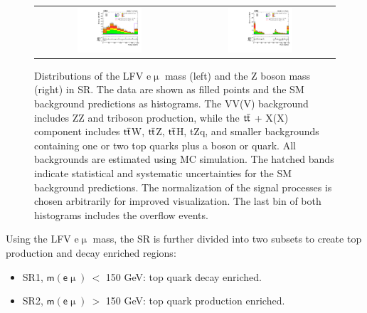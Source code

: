 \begin{figure}[tbh!]
 \begin{center}
 \begin{tabular}{cc}
 \includegraphics[width=0.45\textwidth]{figures/Part3/Selection/Memu}&
 \includegraphics[width=0.45\textwidth]{figures/Part3/Selection/Zmass} \\
 \end{tabular}
 \caption{Distributions of the LFV e$\upmu$ mass (left) and the Z boson mass (right) in \ac{SR}. The data are shown as filled points and the \ac{SM} background predictions as histograms. The VV(V) background includes ZZ and triboson production, while the $\ttbar$ + X(X) component includes $\ttbar$W, $\ttbar$Z, $\ttbar$H, tZq, and smaller backgrounds containing one or two top quarks plus a boson or quark. All backgrounds are estimated using \ac{MC} simulation. The hatched bands indicate statistical and systematic uncertainties for the \ac{SM} background predictions. The normalization of the signal processes is chosen arbitrarily for improved visualization. The last bin of both histograms includes the overflow events.}
 \label{fig:SR}
 \end{center}
\end{figure}

Using the LFV e$\upmu$ mass, the \ac{SR} is further divided into two subsets to create top production and decay enriched regions:

\begin{itemize}
\item SR1, $\textsf{m}(\textsf{e}\upmu)~<$ 150 GeV: top quark decay enriched.
\item SR2, $\textsf{m}(\textsf{e}\upmu)~>$ 150 GeV: top quark production enriched.
\end{itemize}
